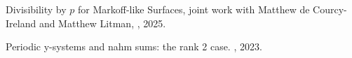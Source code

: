 \documentclass[10pt,a4paper,sans]{moderncv}        %
\begin{document}

%
%



\renewcommand{\refname}{Preprints}
\begin{thebibliography}{1}
   Divisibility by {$p$} for Markoff-like Surfaces,
   \newblock joint work with Matthew de Courcy-Ireland and Matthew Litman,
, 2025.

   Periodic y-systems and nahm sums: the rank 2 case.
, 2023.

\end{thebibliography}
\end{document}
